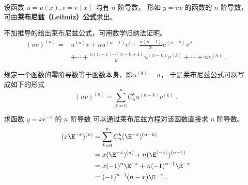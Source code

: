 

设函数 $u=u(x), v=v(x)$ 均有 $n$ 阶导数， 形如 $y=uv$ 的函数的 $n$ 阶导数， 可由\textbf{莱布尼兹（Leibniz）公式}求出。

不加推导的给出莱布尼兹公式，可用数学归纳法证明。
\begin{equation}
\begin{aligned}
(uv)^{(n)}=&u^{(n)}v+nu^{(n-1)}v'+\frac{n(n-1)}{2!}u^{(n-2)}v'' \\
&+ \cdots +\frac{n(n-1) \cdots (n-k+1)}{k!}u^{(n-k)}v^{(k)}+\cdots+uv^{(n)}~.
\end{aligned}
\end{equation}

规定一个函数的零阶导数等于函数本身，即$u^{(0)}=u$， 于是莱布尼兹公式可以写成如下的形式
\begin{equation}\label{eq_LeiEqu_1}
(uv)^{(n)}=\sum_{k=0}^{n} C_{n}^{k}u^{(n-k)}v^{(k)}~.
\end{equation}

\begin{example}{求函数 $y=xe^{-x}$ 的 $n$ 阶导数}
可以通过莱布尼兹方程对该函数直接求 $n$ 阶导数。
\begin{equation}
\begin{aligned}
(x\E^{-x})^{(n)}&=\sum_{k=0}^{n} C_{n}^{k}(\E^{-x})^{(n-k)}\\
&=x(\E^{-x})^{(n)}+n(\E^{(-x)})^{(n-1)}\\
&=x(-1)^n\E^{-x}+n(-1)^{n-1}\E^{-x}\\
&=(-1)^{n-1}(n-x)\E^{-x}~.
\end{aligned}
\end{equation}
\end{example}
